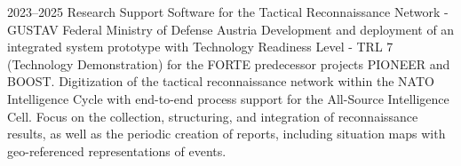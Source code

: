 \cventry
{2023--2025}
{Research}
{Support Software for the Tactical Reconnaissance Network - GUSTAV}
{Federal Ministry of Defense}
{Austria}
{
  Development and deployment of an integrated system prototype with
  Technology Readiness Level - TRL 7 (Technology Demonstration) for the FORTE predecessor projects PIONEER and BOOST.
  Digitization of the tactical reconnaissance network within the NATO Intelligence Cycle
  with end-to-end process support for the All-Source Intelligence Cell.
  Focus on the collection, structuring, and integration of reconnaissance results, as well as the periodic creation
  of reports, including situation maps with geo-referenced representations of events.
}
